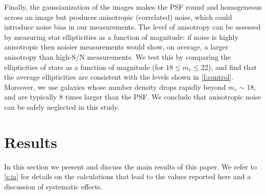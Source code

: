 Finally, the gaussianization of the images makes the PSF round and homogeneous across an image but 
produces anisotropic (correlated) noise, which could introduce noise bias in our measurements. The 
level of anisotropy can be assessed by measuring star ellipticities as a function of magnitude: 
if noise is highly anisotropic then noisier measurements would show, on average, a larger 
anisotropy than high-S/N measurements. We test this by comparing the ellipticities of stars as a 
function of magnitude (for $18\leq m_r\leq22$), and find that the average ellipticities are 
consistent with the levels shown in \cref{f:control}. Moreover, we use galaxies whose number 
density 
drops rapidly beyond $m_r\sim18$, and are typically 8 times larger than the PSF. We conclude that 
anisotropic noise can be safely neglected in this study.

\section{Results}\label{s:results}

In this section we present and discuss the main results of this paper. We refer to \cref{s:ia} 
for details on the calculations that lead to the values reported here and a discussion of 
systematic effects.

